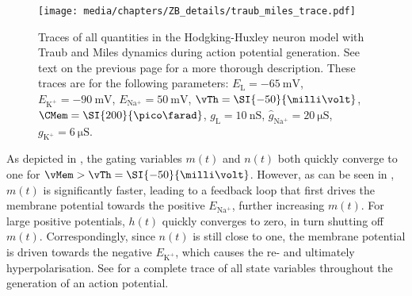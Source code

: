 \begin{figure}[p]
	\centering
	\texttt{[image: media/chapters/ZB\_details/traub\_miles\_trace.pdf]}
	\caption[State of the Hodgkin-Huxley model during action potential generation]{Traces of all quantities in the Hodgking-Huxley neuron model with Traub and Miles dynamics during action potential generation. See text on the previous page for a more thorough description. These traces are for the following parameters: $E_\mathrm{L} = \SI{-65}{\milli\volt}$, $E_\mathrm{K^+} = \SI{-90}{\milli\volt}$, $E_\mathrm{Na^+} = \SI{50}{\milli\volt}$, $\vTh = \SI{-50}{\milli\volt}$, $\CMem = \SI{200}{\pico\farad}$, $g_\mathrm{L} = \SI{10}{\nano\siemens}$, $\hat g_\mathrm{Na^+} = \SI{20}{\micro\siemens}$, $g_\mathrm{K^+} = \SI{6}{\micro\siemens}$.}
	\label{fig:traub_miles_trace}
\end{figure}

As depicted in , the gating variables $m(t)$ and $n(t)$ both quickly converge to one for $\vMem > \vTh = \SI{-50}{\milli\volt}$.
However, as can be seen in , $m(t)$ is significantly faster, leading to a feedback loop that first drives the membrane potential towards the positive $E_\mathrm{Na^+}$, further increasing $m(t)$.
For large positive potentials, $h(t)$ quickly converges to zero, in turn shutting off $m(t)$.
Correspondingly, since $n(t)$ is still close to one, the membrane potential is driven towards the negative $E_\mathrm{K^+}$, which causes the re- and ultimately hyperpolarisation.
See  for a complete trace of all state variables throughout the generation of an action potential.
